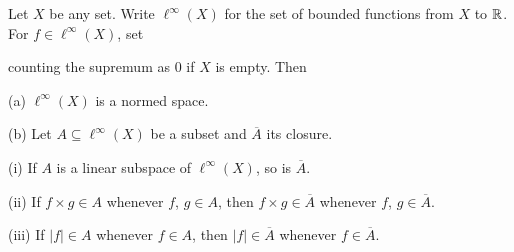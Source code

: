  Let $X$ be any set.   Write $\ell^{\infty}(X)$ 
for the set of bounded functions from $X$ to $\Bbb R$.   For 
$f\in\ell^{\infty}(X)$, set 
      
      
\noindent counting the supremum as $0$ if $X$ is empty.   Then 
      
(a) $\ell^{\infty}(X)$ is a normed space. 
      
(b) Let $A\subseteq\ell^{\infty}(X)$ be a subset and 
$\overline{A}$ its closure. 
      
\quad (i) If $A$ is a linear subspace of $\ell^{\infty}(X)$, so is 
$\overline{A}$. 
      
\quad (ii) If $f\times g\in A$ whenever $f$, $g\in A$, then  
$f\times g\in\overline{A}$ whenever $f$, $g\in\overline{A}$. 
      
\quad (iii) If $|f|\in A$ whenever $f\in A$, then $|f|\in\overline{A}$ 
whenever $f\in\overline{A}$. 
      
